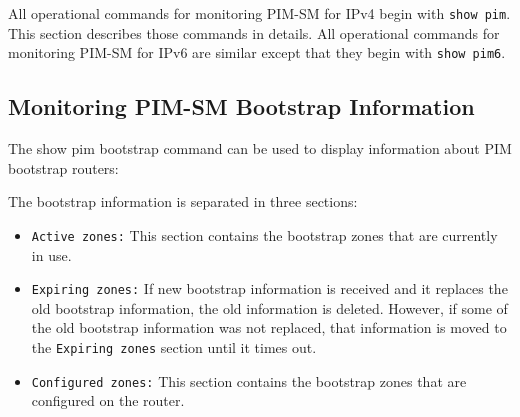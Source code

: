 All operational commands for monitoring PIM-SM for IPv4 begin with
{\tt show pim}. This section describes those commands in details. All
operational commands for monitoring PIM-SM for IPv6 are similar except that
they begin with {\tt show pim6}.

\subsection{Monitoring PIM-SM Bootstrap Information}

The {\stt show pim bootstrap} command can be used to display
information about PIM bootstrap routers:

\vspace{0.1in}
\noindent{}
\vspace{0.1in}

The bootstrap information is separated in three sections:
\begin{itemize}

  \item {\tt Active zones:} This section contains the bootstrap zones that are
  currently in use.

  \item {\tt Expiring zones:} If new bootstrap information is received and it
  replaces the old bootstrap information, the old information is deleted.
  However, if some of the old bootstrap information was not replaced,
  that information is moved to the {\tt Expiring zones} section until
  it times out.

  \item {\tt Configured zones:} This section contains the bootstrap zones that
  are configured on the router.

\end{itemize}

